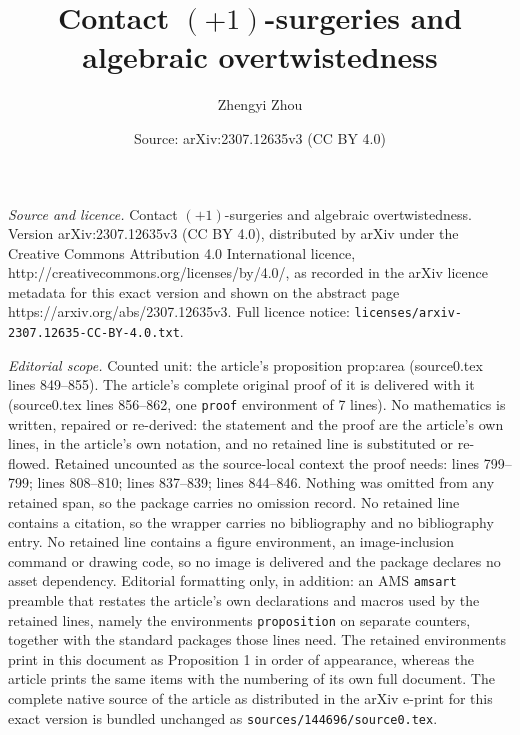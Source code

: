 \documentclass[10pt,a4paper]{amsart}
\title{Contact $(+1)$-surgeries and algebraic overtwistedness}
\author{Zhengyi Zhou}
\date{Source: arXiv:2307.12635v3 (CC BY 4.0)}
\begin{document}
\maketitle

\noindent\emph{Source and licence.} Contact $(+1)$-surgeries and algebraic overtwistedness. Version arXiv:2307.12635v3 (CC BY 4.0), distributed by arXiv under the Creative Commons Attribution 4.0 International licence, http://creativecommons.org/licenses/by/4.0/, as recorded in the arXiv licence metadata for this exact version and shown on the abstract page https://arxiv.org/abs/2307.12635v3. Full licence notice: \texttt{licenses/arxiv-2307.12635-CC-BY-4.0.txt}.\par\smallskip

\noindent\textit{Editorial scope.} Counted unit: the article's proposition prop:area (source0.tex lines 849--855). The article's complete original proof of it is delivered with it (source0.tex lines 856--862, one \texttt{proof} environment of 7 lines). No mathematics is written, repaired or re-derived: the statement and the proof are the article's own lines, in the article's own notation, and no retained line is substituted or re-flowed.  Retained uncounted as the source-local context the proof needs: lines 799--799; lines 808--810; lines 837--839; lines 844--846.  Nothing was omitted from any retained span, so the package carries no omission record.  No retained line contains a citation, so the wrapper carries no bibliography and no bibliography entry.  No retained line contains a figure environment, an image-inclusion command or drawing code, so no image is delivered and the package declares no asset dependency.  Editorial formatting only, in addition: an AMS \texttt{amsart} preamble that restates the article's own declarations and macros used by the retained lines, namely the environments \texttt{proposition} on separate counters, together with the standard packages those lines need.  The retained environments print in this document as Proposition 1 in order of appearance, whereas the article prints the same items with the numbering of its own full document.  The complete native source of the article as distributed in the arXiv e-print for this exact version is bundled unchanged as \texttt{sources/144696/source0.tex}.
\end{document}
